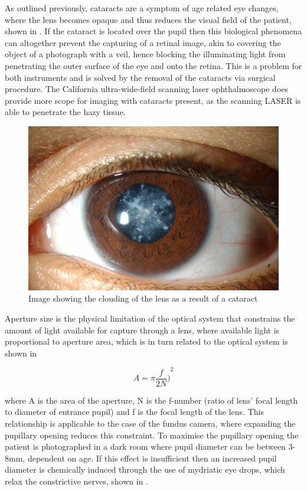 As outlined previously, cataracts are a symptom of age related eye changes, where the lens becomes opaque and thus reduces the visual field of the patient, shown in . If the cataract is located over the pupil then this biological phenomena can altogether prevent the capturing of a retinal image, akin to covering the object of a photograph with a veil, hence blocking the illuminating light from penetrating the outer surface of the eye and onto the retina. This is a problem for both instruments and is solved by the removal of the cataracts via surgical procedure. The California ultra-wide-field scanning laser ophthalmoscope does provide more scope for imaging with cataracts present, as the scanning LASER is able to penetrate the hazy tissue.

\begin{figure}[htbp]
\centering
  \includegraphics{figures/cataract}
\caption{Image showing the clouding of the lens as a result of a cataract}
\label{fig:cat}
     \end{figure}

 
Aperture size is the physical limitation of the optical system that constrains the amount of light available for capture through a lens, where available light is proportional to aperture area, which is in turn related to the optical system is shown in  

\begin{equation}
A = \pi{\frac{f}{2N})}^2
\label{eq:optical_system}
\end{equation}

where A is the area of the aperture, N is the f-number (ratio of lens' focal length to diameter of entrance pupil) and f is the focal length of the lens. This relationship is applicable to the case of the fundus camera, where expanding the pupillary opening reduces this constraint. To maximise the pupillary opening the patient is photographed in a dark room where pupil diameter can be between 3-8mm, dependent on age. If this effect is insufficient then an increased pupil diameter is chemically induced through the use of mydriatic eye drops, which relax the constrictive nerves, shown in .

